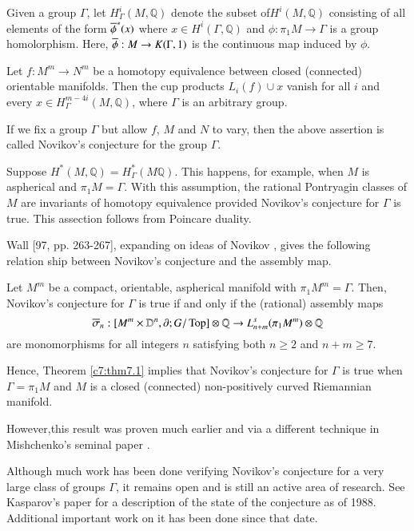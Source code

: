 \begin{defi}\label{c8:defi8.4}
  Given a group $\Gamma$, let $H_\Gamma^i (M, \mathbb{Q})$ denote the
  subset of\break $H^i (M , \mathbb{Q})$ consisting of all elements of the
  form 
$\overline{\phi}^{*}(x)$ where $x\in H^{i}(\Gamma,\mathbb{Q})$ and
  $\phi:\pi_{1}M\to \Gamma$ is a group homolorphism. Here,
$\overline{\phi}: M \to K (\Gamma, 1)$ is the continuous map induced
  by $\phi$. 
\end{defi}

\begin{conj}\label{c8:conj8.5}
   Let $f: M^m \to N^m$ be a homotopy equivalence
  between closed (connected) orientable manifolds. Then the cup
  products $L_i (f) \cup x$ vanish for all $i$ and every $x \in
  H_\Gamma^{m- 4i} (M, \mathbb{Q})$, where $\Gamma$ is an arbitrary
  group.
\end{conj}

If we fix a group $\Gamma$ but allow $f$, $M$ and $N$ to vary, then
the above assertion is called Novikov's conjecture for the group
$\Gamma$. 

\begin{remark}\label{c8:rem4}
  Suppose $H^* (M, \mathbb{Q})= H_{\Gamma}^* (M \mathbb{Q})$. This
  happens, for example, when $M$ is aspherical and $\pi_1 M
  =\Gamma$. With this assumption, the rational Pontryagin classes of
  $M$ are invariants of homotopy equivalence provided Novikov's
  conjecture for $\Gamma$ is true. This assection follows from
  Poincare duality.
\end{remark}

Wall [97, pp. 263-267], expanding on ideas of Novikov \cite{79}, gives
the following relation ship between Novikov's conjecture and the
assembly map.

\begin{thm}\label{c8:thm8.6}
  Let $M^m$ be a compact, orientable, aspherical manifold with $\pi_1
  M^m =\Gamma$. Then, Novikov's conjecture for $\Gamma$ is true if and
  only if the (rational) assembly maps
  $$
  \overline{\sigma}_n : [M^m \times \mathbb{D}^n, \partial ; G/ \operatorname{Top}]
  \otimes \mathbb{Q} \to L_{n+m}^s (\pi_1 M^m) \otimes \mathbb{Q}
  $$
  are monomorphisms for all integers $n$ satisfying both $n \geq 2$
  and $n+ m \geq 7$.
\end{thm}

\begin{remark}\label{c8:rem5}
  Hence, Theorem \ref{c7:thm7.1} implies that Novikov's conjecture for
  $\Gamma$ is true when $\Gamma = \pi_1 M$ and $M$ is a closed
  (connected) non-positively curved Riemannian manifold.
\end{remark}

However,\pageoriginale this result was proven much earlier and via a different
technique in Mishchenko's seminal paper \cite{73}.

\begin{remark}\label{c8:rem6}
  Although much work has been done verifying Novikov's conjecture for
  a very large class of groups $\Gamma$, it remains open and is still
  an active area of research. See Kasparov's paper \cite{64} for a
  description of the state of the conjecture as of 1988. Additional
  important work on it has been done since that date.
\end{remark}

